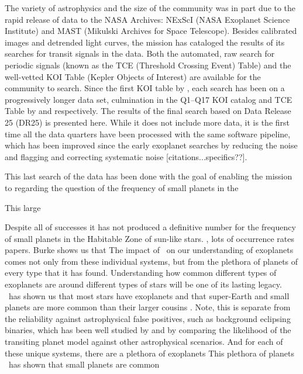 The variety of astrophysics and the size of the \Kepler{} community was in part due to the rapid release of \Kepler{} data to the NASA Archives: NExScI (NASA Exoplanet Science Institute) and MAST (Mikulski Archives for Space Telescope).  Besides calibrated images and detrended light curves, the mission has cataloged the results of its searches for transit signals in the data. Both the automated, raw search for periodic signals (known as the TCE (Threshold Crossing Event) Table) and the well-vetted KOI Table (Kepler Objects of Interest) are available for the community to search.  Since the first KOI table by \citet{Borucki2011a}, each search has been on a progressively longer data set, culmination in the Q1--Q17 KOI catalog and TCE Table by \citet{Coughlin2016} and \citet{Seader2015} respectively.  The results of the final search based on Data Release 25 (DR25) is presented here. While it does not include more data, it is the first time all the data quarters have been processed with the same software pipeline, which has been improved since the early exoplanet searches by reducing the noise and flagging and correcting systematic noise [citations...specifics??].

This last search of the data has been done with the goal of enabling the mission to regarding the question of the frequency of small planets in the 
 

This large 

Despite all of \keplers{} successes it has not produced a definitive number for the frequency of small planets in the Habitable Zone of sun-like stars. \citet{Dressing2013,Dressing2015}, lots of occurrence rates papers.   Burke shows us that 
The impact of \Kepler\ on our understanding of exoplanets comes not only from these individual systems, but from the plethora of planets of every type that it has found. Understanding how common different types of exoplanets are around different types of stars will be one of its lasting legacy. \Kepler\ has shown us that most stars have exoplanets and that super-Earth and small planets are more common than their larger cousins \citet{Burke2015}.  
Note, this is separate from the reliability against astrophysical false positives, such as background eclipsing binaries, which has been well studied by \citet{Morton2016} and \citet{Torres2012} by comparing the likelihood of the transiting planet model against other astrophysical scenarios.
And for each of these unique systems, there are a plethora of exoplanets This plethora of planets \Kepler\ has shown that small planets are common 

